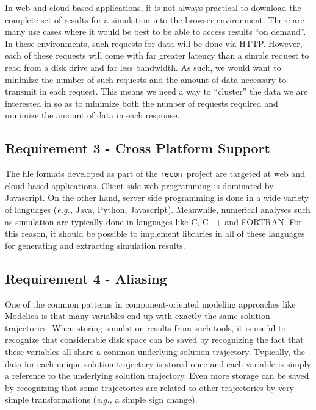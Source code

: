 \documentclass[11pt,a4paper,twocolumn]{article}
\newcommand{\recon}{\texttt{recon}}
\begin{document}

In web and cloud based applications, it is not always practical to
download the complete set of results for a simulation into the browser
environment.  There are many use cases where it would be best to be
able to access results ``on demand''.  In these environments, such
requests for data will be done via HTTP\cite{HTTP}.  However, each of
these requests will come with far greater latency than a simple
request to read from a disk drive and far less bandwidth.  As such, we
would want to minimize the number of such requests and the amount of
data necessary to transmit in each request.  This means we need a way
to ``cluster'' the data we are interested in so as to minimize both
the number of requests required and minimize the amount of data in
each response.

\subsection{Requirement 3 - Cross Platform Support}


The file formats developed as part of the \recon\ project are targeted
at web and cloud based applications.  Client side web programming is
dominated by Javascript.  On the other hand, server side programming
is done in a wide variety of languages (\textit{e.g.,} Java, Python,
Javascript).  Meanwhile, numerical analyses such as simulation are
typically done in languages like C, C++ and FORTRAN.  For this reason,
it should be possible to implement libraries in all of these languages
for generating and extracting simulation results.

\subsection{Requirement 4 - Aliasing}


One of the common patterns in component-oriented modeling approaches
like Modelica is that many variables end up with exactly the same
solution trajectories.  When storing simulation results from such
tools, it is useful to recognize that considerable disk space can be
saved by recognizing the fact that these variables all share a common
underlying solution trajectory.  Typically, the data for each unique
solution trajectory is stored once and each variable is simply a
reference to the underlying solution trajectory.  Even more storage
can be saved by recognizing that some trajectories are related to
other trajectories by very simple transformations (\textit{e.g.,} a simple
sign change).
\end{document}
